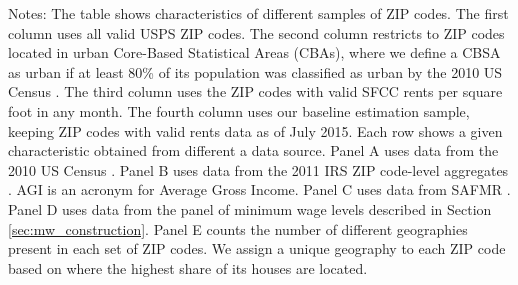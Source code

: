 \begin{landscape}
\begin{table}[hbt!]
    \begin{minipage}{.95\linewidth} \footnotesize
        \vspace{2mm}
        Notes: The table shows characteristics of different samples of ZIP codes.
        The first column uses all valid USPS ZIP codes.
        The second column restricts to ZIP codes located in urban Core-Based
        Statistical Areas (CBAs), where we define a CBSA as urban if at least
        80\% of its population was classified as urban by the 2010 US Census
        \parencite{CensusDecennial}.
        The third column uses the ZIP codes with valid SFCC rents per square 
        foot in any month.
        The fourth column uses our baseline estimation sample, keeping ZIP codes
        with valid rents data as of July 2015.
        Each row shows a given characteristic obtained from different a data 
        source.
        Panel A uses data from the 2010 US Census \parencite{CensusDecennial}.
        Panel B uses data from the 2011 IRS ZIP code-level aggregates
        \parencite{IRS}. AGI is an acronym for Average Gross Income.
        Panel C uses data from SAFMR \parencite{hudSAFMR}.
        Panel D uses data from the panel of minimum wage levels described in 
        Section \ref{sec:mw_construction}.
        Panel E counts the number of different geographies present in each set
        of ZIP codes.
        We assign a unique geography to each ZIP code based on where the highest
        share of its houses are located.
    \end{minipage}
\end{table}
\end{landscape}
